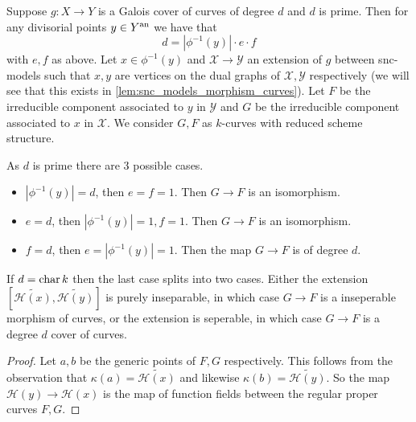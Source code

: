 \begin{remark}\label{rem:balancing_galois_cover}
	Suppose $g:X \to Y$ is a Galois cover of curves of degree $d$ and $d$ is prime.
	Then for any divisorial points $y \in Y{}^{\text{an}}$ we have that \[
		d = |\phi^{-1}(y)| \cdot e \cdot f
	\] 
	with $e, f$ as above. 
	Let $x \in \phi^{-1}(y)$ and $\mathscr X \to \mathscr Y$ an extension of $g$ between snc-models such that $x, y$ are vertices on the dual graphs of $\mathscr X, \mathscr Y$ respectively (we will see that this exists in \cref{lem:snc_models_morphism_curves}).
	Let $F$ be the irreducible component associated to $y$ in $\mathscr Y$ and $G$ be the irreducible component associated to $x$ in  $\mathscr X$. 
	We consider $G, F$ as $k$-curves with reduced scheme structure. 

	As $d$ is prime there are 3 possible cases. 
	\begin{itemize}
		\item $|\phi^{-1}(y)| = d$, then $e = f = 1$.  
			Then $G \to F$ is an isomorphism. 
		\item $e = d$, then $|\phi^{-1}(y)| = 1, f = 1$. 
			Then $G \to F$ is an isomorphism. 
		\item $f = d$, then $e = |\phi^{-1}(y)| = 1$. 
			Then the map $G \to F$ is of degree $d$. 
	\end{itemize}
	If $d = \operatorname{char} k$ then the last case splits into two cases. 
	Either the extension $\left[\widetilde{\mathcal{H} (x)}, \widetilde {\mathcal{H} (y)}\right]$ is purely inseparable, in which case $G \to F$ is a inseperable morphism of curves, or the extension is seperable, in which case $G \to F$ is a degree $d$ cover of curves.
\end{remark}
\begin{proof}
	Let $a, b$ be the generic points of $F, G$ respectively. 
	This follows from the observation that $\kappa(a) = \widetilde{\mathcal{H} (x)}$ and likewise $\kappa(b) = \widetilde{\mathcal{H} (y)}$.
	So the map $\mathcal{H} (y) \to \mathcal{H} (x)$ is the map of function fields between the regular proper curves $F, G$. 
\end{proof}

